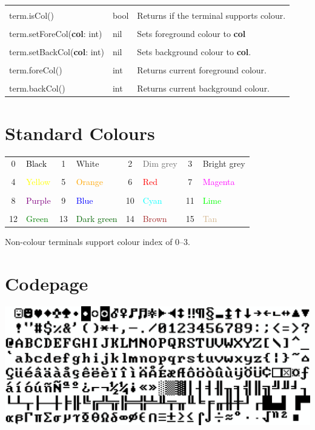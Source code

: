 \begin{tabularx}{\textwidth}{l l X}
	\\ \\
	term.isCol() & bool & Returns if the terminal supports colour.
	\\ \\
	term.setForeCol(\textbf{col}: int) & nil & Sets foreground colour to \textbf{col}
	\\ \\
	term.setBackCol(\textbf{col}: int) & nil & Sets background colour to \textbf{col}.
	\\ \\
	term.foreCol() & int & Returns current foreground colour.
	\\ \\
	term.backCol() & int & Returns current background colour.
\end{tabularx}

\section{Standard Colours}

\begin{tabularx}{\textwidth}{c l c l c l c l}
	0 & \textcolor{black}{Black} & 1 & White & 2 & \textcolor{dimgrey}{Dim grey} & 3 & \textcolor{brightgrey}{Bright grey}
	\\ \\
	4 & \textcolor{yellow}{Yellow} & 5 & \textcolor{orange}{Orange} & 6 & \textcolor{red}{Red} & 7 & \textcolor{magenta}{Magenta}
	\\ \\
	8 & \textcolor{purple}{Purple} & 9 & \textcolor{blue}{Blue} & 10 & \textcolor{cyan}{Cyan} & 11 & \textcolor{lime}{Lime}
	\\ \\
	12 & \textcolor{green}{Green} & 13 & \textcolor{darkgreen}{Dark green} & 14 & \textcolor{brown}{Brown} & 15 & \textcolor{tan}{Tan}
\end{tabularx}

Non-colour terminals support colour index of 0--3.

\section{Codepage}

\newlength{\cpimagew}
\setlength{\cpimagew}{\linewidth}
\addtolength{\cpimagew}{-4em}

\begin{center}\includegraphics[width=\cpimagew]{mda.png}\end{center}

